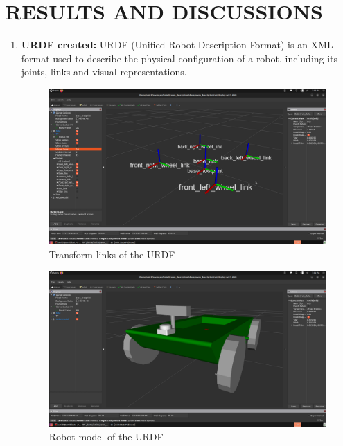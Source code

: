 \newpage

\pagestyle{fancy}
\fancyhf{} 
\fancyhead[L]{{\footnotesize \textbf{\shortprojname}}\hfill{\footnotesize \leftmark}}
\fancyfoot[C]{\thepage}


\chapter{RESULTS AND DISCUSSIONS} \label{chap:ResDis}
{
	\fontsize{12}{14}
	
	\begin{enumerate}[label=\textbf{\arabic*}., leftmargin=*]
		\item \textbf{URDF created:} URDF (Unified Robot Description Format) is an XML format used to
		describe the physical configuration of a robot, including its joints, links and visual
		representations.
		
		\begin{figure}[H]
			\centering
			\includegraphics[scale=0.15]{images/Content/Transforms_Links}
			\caption{Transform links of the URDF}
			\label{fig:transformslinks}
		\end{figure}
		
		\begin{figure}[H]
			\centering
			\includegraphics[scale=0.15]{images/Content/Basic_URDF_Model}
			\caption{Robot model of the URDF}
			\label{fig:basicurdfmodel}
		\end{figure}
		

\end{enumerate}}
